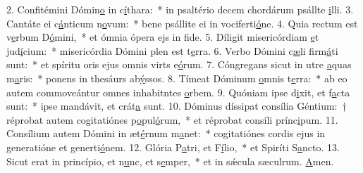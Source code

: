2. Confitémini Dómin\uline{o} in c\uline{í}thara:~* in psaltério decem chordárum psállte \uline{i}lli.
3. Cantáte ei c\uline{á}nticum n\uline{o}vum:~* bene psállite ei in vociferti\uline{ó}ne.
4. Quia rectum est v\uline{e}rbum D\uline{ó}mini,~* et ómnia ópera ejs in f\uline{i}de.
5. Díligit misericórdiam \uline{e}t jud\uline{í}cium:~* misericórdia Dómini plen est t\uline{e}rra.
6. Verbo Dómini c\uline{æ}li firm\uline{á}ti sunt:~* et spíritu oris ejus omnis virts e\uline{ó}rum.
7. Cóngregans sicut in utre \uline{a}quas m\uline{a}ris:~* ponens in thesáurs ab\uline{ý}ssos.
8. Tímeat Dóminum \uline{o}mnis t\uline{e}rra:~* ab eo autem commoveántur omnes inhabitntes \uline{o}rbem.
9. Quóniam ipse d\uline{i}xit, et f\uline{a}cta sunt:~* ipse mandávit, et crát\uline{a} sunt.
10. Dóminus díssipat consília Géntium:~† réprobat autem cogitatiónes p\uline{o}pul\uline{ó}rum,~* et réprobat consíli prínc\uline{i}pum.
11. Consílium autem Dómini in æt\uline{é}rnum m\uline{a}net:~* cogitatiónes cordis ejus in generatióne et generti\uline{ó}nem.
12. Glória P\uline{a}tri, et F\uline{í}lio,~* et Spiríti S\uline{a}ncto.
13. Sicut erat in princípio, et n\uline{u}nc, et s\uline{e}mper,~* et in sǽcula sæculrum. \uline{A}men.
